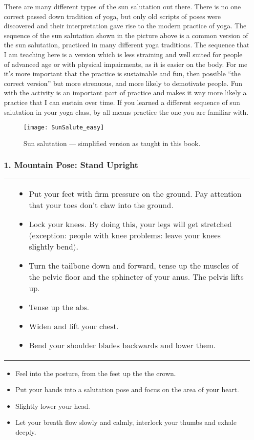 \documentclass[../Book.Stress_regulation.tex]{subfiles}
\begin{document}
There are many different types of the sun salutation out there.
There is no one correct passed down tradition of yoga, but only old scripts of poses were discovered and their interpretation gave rise to the modern practice of yoga.
The sequence of the sun salutation shown in the picture above is a common version of the sun salutation, practiced in many different yoga traditions.
The sequence that I am teaching here is a version which is less straining and well suited for people of advanced age or with physical impairments, as it is easier on the body\cite{VidyaYoga}.
For me it's more important that the practice is sustainable and fun, then possible ``the correct version'' but more strenuous, and more likely to demotivate people.
Fun with the activity is an important part of practice and makes it way more likely a practice that I can sustain over time.
If you learned a different sequence of sun salutation in your yoga class, by all means  practice the one you are familiar with.

\newpage
\begin{figure}[htbp!]
\texttt{[image: SunSalute\_easy]}\label{sf:yogaeasy}
\caption{Sun salutation --- simplified version as taught in this book.}
\end{figure}
\newpage


\subsubsection{1. Mountain Pose: Stand Upright}

\begin{tabular}{p{1.4cm} p{10.1cm}}
  \raisebox{-1.1\totalheight}{\texttt{[image: SS\_Mountain]}} &                                                                     
\begin{itemize}
\item Put your feet with firm pressure on the ground. Pay attention that your toes don't claw into the ground.
\item Lock your knees. By doing this, your legs will get stretched (exception: people with knee problems: leave your knees slightly bend).
\item Turn the tailbone down and forward, tense up the muscles of the pelvic floor and the sphincter of your anus. The pelvis lifts up.
\item Tense up the abs.
\item Widen and lift your chest.
\item Bend your shoulder blades backwards and lower them.
\end{itemize}
\end{tabular}
\noindent \vspace{-5mm}
\begin{itemize}
\item Feel into the posture, from the feet up the the crown.
\item Put your hands into a salutation pose and focus on the area of your heart.
\item Slightly lower your head.
\item Let your breath flow slowly and calmly, interlock your thumbs and exhale deeply.
\end{itemize}
  
\end{document}
